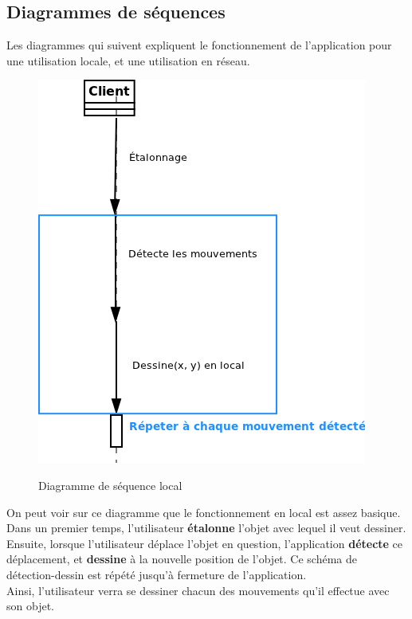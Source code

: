 \documentclass{report}
\begin{document}
			\subsection{Diagrammes de séquences}
			Les diagrammes qui suivent expliquent le fonctionnement de l'application pour une utilisation locale, et une utilisation en réseau.
				\begin{figure}[!h]
						\centering
						\includegraphics[scale=0.6]{../images/sequence_local.png}\\
						\caption{Diagramme de séquence local}
						\label{Diagramme de séquence local}
				\end{figure}
				On peut voir sur ce diagramme que le fonctionnement en local est assez basique. Dans un premier temps, l'utilisateur \textbf{étalonne} l'objet avec lequel il veut dessiner. Ensuite, lorsque l'utilisateur déplace l'objet en question, l'application \textbf{détecte} ce déplacement, et \textbf{dessine} à la nouvelle position de l'objet. Ce schéma de détection-dessin est répété jusqu'à fermeture de l'application. \\
				Ainsi, l'utilisateur verra se dessiner chacun des mouvements qu'il effectue avec son objet.
\end{document}

